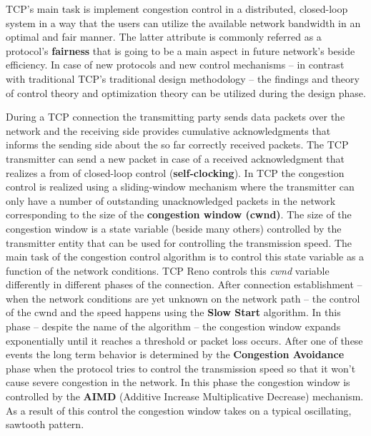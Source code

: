 \documentclass[a4paper]{article}
\begin{document}
TCP's main task is implement congestion control in a distributed, closed-loop system in a way that the users can utilize the available network bandwidth in an optimal and fair manner. The latter attribute is commonly referred as a protocol's \textbf{fairness} that is going to be a main aspect in future network's beside efficiency. In case of new protocols and new control mechanisms -- in contrast with traditional TCP's traditional design methodology -- the findings and theory of control theory and optimization theory can be utilized during the design phase.

During a TCP connection the transmitting party sends data packets over the network and the receiving side provides cumulative acknowledgments that informs the sending side about the so far correctly received packets. The TCP transmitter can send a new packet in case of a received acknowledgment that realizes a from of closed-loop control (\textbf{self-clocking}). In TCP the congestion control is realized using a sliding-window mechanism where the transmitter can only have a number of outstanding unacknowledged packets in the network corresponding to the size of the \textbf{congestion window (cwnd)}. The size of the congestion window is a state variable (beside many others) controlled by the transmitter entity that can be used for controlling the transmission speed. The main task of the congestion control algorithm is to control this state variable as a function of the network conditions. TCP Reno controls this \emph{cwnd} variable differently in different phases of the connection. After connection establishment -- when the network conditions are yet unknown on the network path -- the control of the cwnd and the speed happens using the \textbf{Slow Start} algorithm. In this phase -- despite the name of the algorithm -- the congestion window expands exponentially until it reaches a threshold or packet loss occurs. After one of these events the long term behavior is determined by the \textbf{Congestion Avoidance} phase when the protocol tries to control the transmission speed so that it won't cause severe congestion in the network. In this phase the congestion window is controlled by the \textbf{AIMD} (Additive Increase Multiplicative Decrease) mechanism. As a result of this control the congestion window takes on a typical oscillating, sawtooth pattern.
\end{document}
